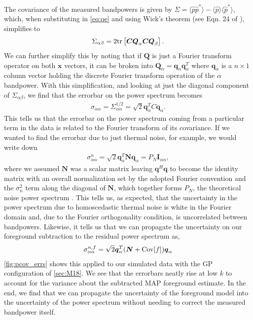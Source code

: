 \documentclass[a4paper,fleqn,usenatbib]{mnras}
\def\N{\boldsymbol{N}}
\def\x{\boldsymbol{x}}
\def\q{\boldsymbol{q}}
\def\Q{\boldsymbol{Q}}
\def\C{\boldsymbol{C}}
\def\I{\boldsymbol{I}}
\def\Cov{{\rm Cov}}
\begin{document}
The covariance of the measured bandpowers is given by $\Sigma = \langle\hat{p}\hat{p}^\ast\rangle - \langle\hat{p}\rangle\langle\hat{p}^\ast\rangle$, which, when substituting in \autoref{eq:qe} and using Wick's theorem (see Eqn. 24 of \citet{Dillon2014}), simplifies to
\begin{align}
\Sigma_{\alpha\beta} = 2{\rm tr}\left[\C\Q_\alpha \C\Q_\beta\right].
\end{align}
We can further simplify this by noting that if $\Q$ is just a Fourier transform operator on both $\x$ vectors, it can be broken into $\Q_\alpha=\q_\alpha\q_\alpha^T$ where $\q_\alpha$ is a $n\times1$ column vector holding the discrete Fourier transform operation of the $\alpha$ bandpower.
With this simplification, and looking at just the diagonal component of $\Sigma_{\alpha\beta}$, we find that the errorbar on the power spectrum becomes
\begin{align}
\sigma_{\alpha\alpha} = \Sigma_{\alpha\alpha}^{1/2} = \sqrt{2}\q_\alpha^TC\q_\alpha.
\end{align}
This tells us that the errorbar on the power spectrum coming from a particular term in the data is related to the Fourier transform of its covariance.
If we wanted to find the errorbar due to just thermal noise, for example, we would write down
\begin{align}
\sigma^n_{\alpha\alpha} = \sqrt{2}\q_\alpha^T\N\q_\alpha = P_N\I_{\alpha\alpha},
\end{align}
where we assumed $\N$ was a scalar matrix leaving $\q^H\q$ to become the identity matrix with an overall normalization set by the adopted Fourier convention and the $\sigma_n^2$ term along the diagonal of $\N$, which together forms $P_N$, the theoretical noise power spectrum \citep{Cheng2018}.
This tells us, as expected, that the uncertainty in the power spectrum due to homoscedastic thermal noise is white in the Fourier domain and, due to the Fourier orthogonality condition, is uncorrelated between bandpowers.
Likewise, it tells us that we can propagate the uncertainty on our foreground subtraction to the residual power spectrum as,
\begin{align}
\sigma^{n,f}_{\alpha\alpha} = \sqrt{2}\q_\alpha^T(\N + \Cov[f])\q_\alpha
\end{align}
\autoref{fig:pcov_errs} shows this applied to our simulated data with the GP configuration of \autoref{sec:M18}.
We see that the errorbars neatly rise at low $k$ to account for the variance about the subtracted MAP foreground estimate.
In the end, we find that we can propagate the uncertainty of the foreground model into the uncertainty of the power spectrum without needing to correct the measured bandpower itself.
\end{document}
